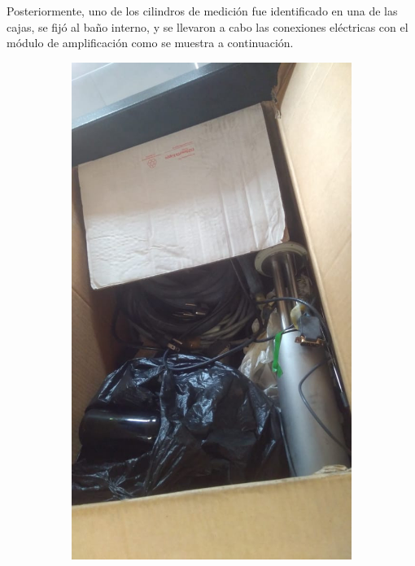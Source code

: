 	Posteriormente, uno de los cilindros de medición fue identificado en una de las cajas, se fijó al baño interno, y se llevaron a cabo las conexiones eléctricas con el módulo de amplificación como se muestra a continuación. 
	\begin{figure}[h]
		\centering
		\begin{subfigure}{0.24\linewidth}
			\includegraphics[width=\linewidth]{Figures/process/box1}
			\caption{ }
			\label{fig: subA}
		\end{subfigure}

\end{figure}
